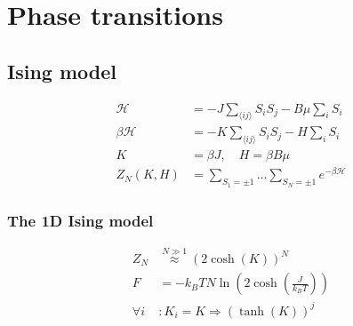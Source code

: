 \section{Phase transitions}

\subsection*{Ising model}
\begin{equation*}
    \begin{aligned}
        \mathcal{H} &= -J \sum_{\langle ij \rangle} S_i S_j - B \mu \sum_i S_i \\
        \beta \mathcal{H} &= - K \sum_{\langle i j \rangle} S_i S_j - H \sum_i S_i \\
        K &= \beta J, \quad H = \beta B \mu\\
        Z_N(K,H) &= \sum_{S_1 = \pm 1} \dots \sum_{S_N = \pm 1} e^{-\beta \mathcal{H}} 
    \end{aligned}
\end{equation*}

\subsubsection*{The 1D Ising model}
\begin{equation*}
    \begin{aligned}
        Z_N &\overset{N \gg 1}{\approx} (2 \cosh(K))^N \\
        F &= -k_B TN \ln \left( 2 \cosh \left(\frac{J}{k_B T}\right) \right) \\
        \forall i &: K_i = K \Rightarrow (\tanh(K))^j
    \end{aligned}
\end{equation*}
